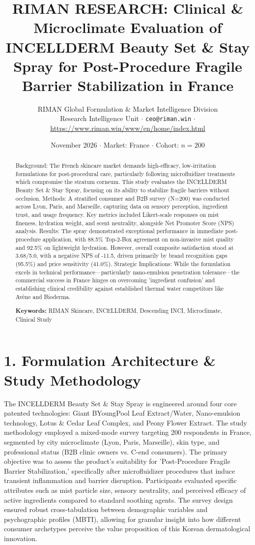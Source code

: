 \documentclass[10pt,twocolumn,a4paper]{article}
\title{\textbf{RIMAN RESEARCH: Clinical \& Microclimate Evaluation of INCELLDERM Beauty Set \& Stay Spray for Post-Procedure Fragile Barrier Stabilization in France}}
\author{RIMAN Global Formulation \& Market Intelligence Division\\
\small Research Intelligence Unit $\cdot$ \texttt{ceo@riman.win} $\cdot$ \url{https://www.riman.win/www/en/home/index.html}}
\date{November 2026 \quad $\cdot$ \quad Market: France \quad $\cdot$ \quad Cohort: $n = 200$}
\begin{document}
\maketitle

\begin{abstract}
Background: The French skincare market demands high-efficacy, low-irritation formulations for post-procedural care, particularly following microfluidizer treatments which compromise the stratum corneum. This study evaluates the INCELLDERM Beauty Set \& Stay Spray, focusing on its ability to stabilize fragile barriers without occlusion. Methods: A stratified consumer and B2B survey (N=200) was conducted across Lyon, Paris, and Marseille, capturing data on sensory perception, ingredient trust, and usage frequency. Key metrics included Likert-scale responses on mist fineness, hydration weight, and scent neutrality, alongside Net Promoter Score (NPS) analysis. Results: The spray demonstrated exceptional performance in immediate post-procedure application, with 88.5\% Top-2-Box agreement on non-invasive mist quality and 92.5\% on lightweight hydration. However, overall composite satisfaction stood at 3.68/5.0, with a negative NPS of -11.5, driven primarily by brand recognition gaps (95.5\%) and price sensitivity (41.0\%). Strategic Implications: While the formulation excels in technical performance—particularly nano-emulsion penetration tolerance—the commercial success in France hinges on overcoming 'ingredient confusion' and establishing clinical credibility against established thermal water competitors like Avène and Bioderma.

\vspace{0.4em}
\noindent\textbf{Keywords:} RIMAN Skincare, INCELLDERM, Descending INCI, Microclimate, Clinical Study
\end{abstract}

\section{1. Formulation Architecture \& Study Methodology}
The INCELLDERM Beauty Set \& Stay Spray is engineered around four core patented technologies: Giant BYoungPool Leaf Extract/Water, Nano-emulsion technology, Lotus \& Cedar Leaf Complex, and Peony Flower Extract. The study methodology employed a mixed-mode survey targeting 200 respondents in France, segmented by city microclimate (Lyon, Paris, Marseille), skin type, and professional status (B2B clinic owners vs. C-end consumers). The primary objective was to assess the product's suitability for 'Post-Procedure Fragile Barrier Stabilization,' specifically after microfluidizer procedures that induce transient inflammation and barrier disruption. Participants evaluated specific attributes such as mist particle size, sensory neutrality, and perceived efficacy of active ingredients compared to standard soothing agents. The survey design ensured robust cross-tabulation between demographic variables and psychographic profiles (MBTI), allowing for granular insight into how different consumer archetypes perceive the value proposition of this Korean dermatological innovation.
\end{document}
